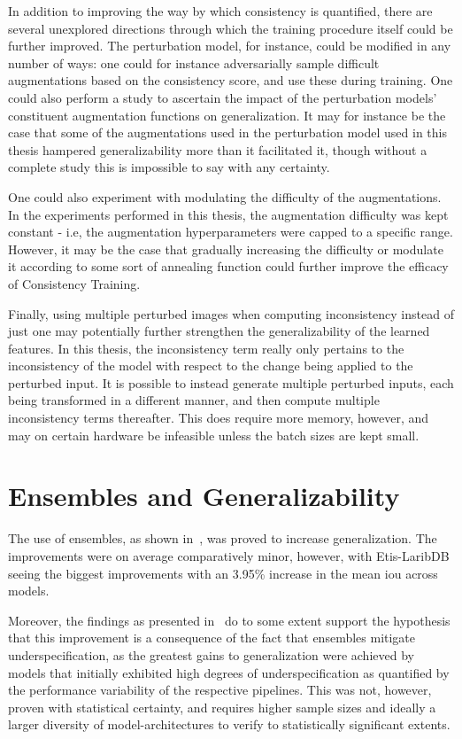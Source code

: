    In addition to improving the way by which consistency is quantified, there are several unexplored directions through which the training procedure itself could be further improved. The perturbation model, for instance, could be modified in any number of ways: one could for instance adversarially sample difficult augmentations based on the consistency score, and use these during training. One could also perform a study to ascertain the impact of the perturbation models' constituent augmentation functions on generalization. It may for instance be the case that some of the augmentations used in the perturbation model used in this thesis hampered generalizability more than it facilitated it, though without a complete study this is impossible to say with any certainty.  
    
    One could also experiment with modulating the difficulty of the augmentations. In the experiments performed in this thesis, the augmentation difficulty was kept constant - i.e, the augmentation hyperparameters were capped to a specific range. However, it may be the case that gradually increasing the difficulty or modulate it according to some sort of annealing function could further improve the efficacy of Consistency Training. 
    
    Finally, using multiple perturbed images when computing inconsistency instead of just one may potentially further strengthen the generalizability of the learned features. In this thesis, the inconsistency term really only pertains to the inconsistency of the model with respect to the change being applied to the perturbed input. It is possible to  instead generate multiple perturbed inputs, each being transformed in a different manner, and then compute multiple inconsistency terms thereafter. This does require more memory, however, and may on certain hardware be infeasible unless the batch sizes are kept small. 
    
\section{Ensembles and Generalizability}
    The use of ensembles, as shown in~, was proved to increase generalization. The improvements were on average comparatively minor, however, with Etis-LaribDB seeing the biggest improvements with an 3.95\% increase in the mean \gls{iou} across models. 
    
    Moreover, the findings as presented in~ do to some extent support the hypothesis that this improvement is a consequence of the fact that ensembles mitigate underspecification, as the greatest gains to generalization were achieved by models that initially exhibited high degrees of underspecification as quantified by the performance variability of the respective pipelines. This was not, however, proven with statistical certainty, and requires higher sample sizes and ideally a larger diversity of model-architectures to verify to statistically significant extents.  

